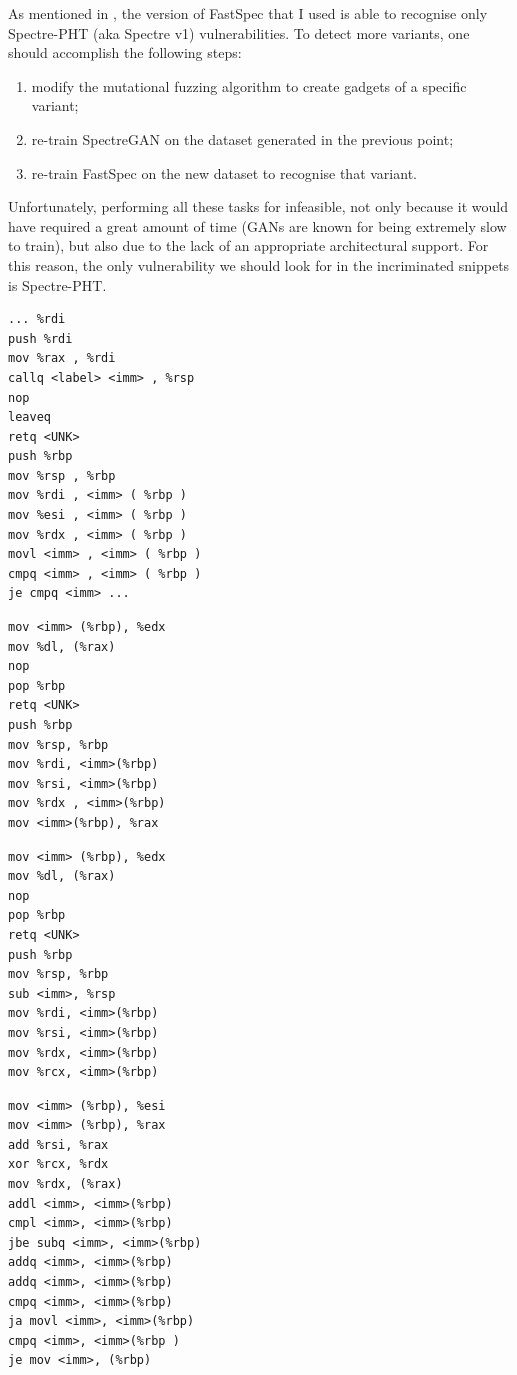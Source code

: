 \documentclass[12pt,a4paper]{book}
\theoremstyle{definition}
\begin{document}
	As mentioned in \cite{Tol2021}, the version of FastSpec that I used is able to recognise only Spectre-PHT (aka Spectre v1) vulnerabilities. To detect more variants, one should accomplish the following steps:
	\begin{enumerate}
		\item modify the mutational fuzzing algorithm to create gadgets of a specific variant;
		\item re-train SpectreGAN on the dataset generated in the previous point;
		\item re-train FastSpec on the new dataset to recognise that variant.
	\end{enumerate}
	Unfortunately, performing all these tasks for infeasible, not only because it would have required a great amount of time (GANs are known for being extremely slow to train), but also due to the lack of an appropriate architectural support. For this reason, the only vulnerability we should look for in the incriminated snippets is Spectre-PHT.
		
	\begin{minipage}{.45\textwidth}
		\begin{lstlisting}[caption={Window 369-379}, label=gadget1]
... %rdi
push %rdi
mov %rax , %rdi
callq <label> <imm> , %rsp
nop
leaveq
retq <UNK>
push %rbp
mov %rsp , %rbp
mov %rdi , <imm> ( %rbp )
mov %esi , <imm> ( %rbp )
mov %rdx , <imm> ( %rbp )
movl <imm> , <imm> ( %rbp )
cmpq <imm> , <imm> ( %rbp )
je cmpq <imm> ...
		\end{lstlisting}
	\end{minipage}\hfill
	\begin{minipage}{.45\textwidth}
		\begin{lstlisting}[caption={Window 7992-7997}, label=gadget2]
mov <imm> (%rbp), %edx
mov %dl, (%rax)
nop
pop %rbp
retq <UNK>
push %rbp
mov %rsp, %rbp
mov %rdi, <imm>(%rbp)
mov %rsi, <imm>(%rbp)
mov %rdx , <imm>(%rbp)
mov <imm>(%rbp), %rax
		\end{lstlisting}
	\end{minipage}

	\begin{minipage}{.45\textwidth}
	\begin{lstlisting}[caption={Window 11024-11031}, label=gadget3]
mov <imm> (%rbp), %edx
mov %dl, (%rax)
nop
pop %rbp
retq <UNK>
push %rbp
mov %rsp, %rbp
sub <imm>, %rsp
mov %rdi, <imm>(%rbp)
mov %rsi, <imm>(%rbp)
mov %rdx, <imm>(%rbp)
mov %rcx, <imm>(%rbp)
	\end{lstlisting}
\end{minipage}\hfill
\begin{minipage}{.45\textwidth}
	\begin{lstlisting}[caption={Window 11351-11392}, label=gadget4]
mov <imm> (%rbp), %esi
mov <imm> (%rbp), %rax
add %rsi, %rax
xor %rcx, %rdx
mov %rdx, (%rax)
addl <imm>, <imm>(%rbp)
cmpl <imm>, <imm>(%rbp)
jbe subq <imm>, <imm>(%rbp)
addq <imm>, <imm>(%rbp)
addq <imm>, <imm>(%rbp)
cmpq <imm>, <imm>(%rbp)
ja movl <imm>, <imm>(%rbp)
cmpq <imm>, <imm>(%rbp )
je mov <imm>, (%rbp)
	\end{lstlisting}
\end{minipage}
\end{document}
